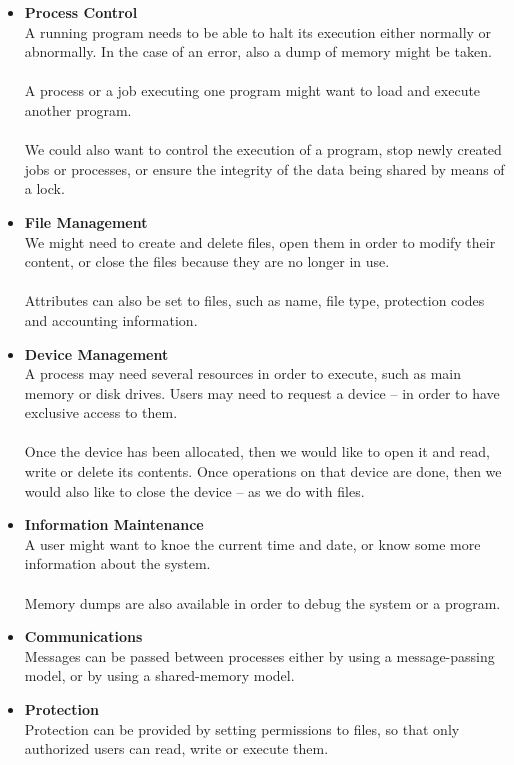 \documentclass{article}
\begin{document}
\begin{itemize}
	\item \textbf{Process Control}
	\vspace{.2cm} \\
	A running program needs to be able to halt its execution either normally or abnormally. In the case of an error, also a dump of memory might be taken. \\ \\
	A process or a job executing one program might want to load and execute another program. \\ \\
	We could also want to control the execution of a program, stop newly created jobs or processes, or ensure the integrity of the data being shared by means of a lock.
	
	\item \textbf{File Management}
	\vspace{.2cm} \\
	We might need to create and delete files, open them in order to modify their content, or close the files because they are no longer in use. \\ \\
	Attributes can also be set to files, such as name, file type,  protection codes and accounting information.		
	
	\item \textbf{Device Management}
	\vspace{.2cm} \\
	A process may need several resources in order to execute, such as main memory or disk drives. Users may need to request a device -- in order to have exclusive access to them. \\ \\
	Once the device has been allocated, then we would like to open it and read, write or delete its contents. Once operations on that device are done, then we would also like to close the device -- as we do with files.
	
	\item \textbf{Information Maintenance}
	\vspace{.2cm} \\
	A user might want to knoe the current time and date, or know some more information about the system. \\ \\
	Memory dumps are also available in order to debug the system or a program.
	
	\item \textbf{Communications}
	\vspace{.2cm} \\
	Messages can be passed between processes either by using a message-passing model, or by using a shared-memory model.	
	
	\item \textbf{Protection}
	\vspace{.2cm} \\
	Protection can be provided by setting permissions to files, so that only authorized users can read, write or execute them.
\end{itemize}
\end{document}
